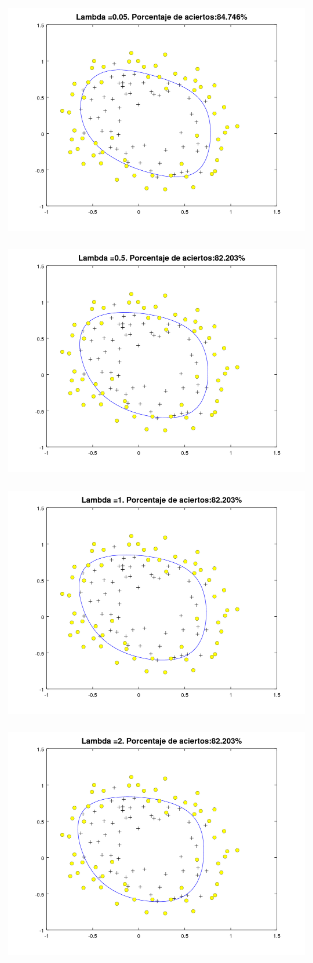 \documentclass{article}
\begin{document}
\begin{figure}[h]
\centering
\includegraphics[width=0.7\textwidth]{estudio4}
\label{fig:estudio}
\end{figure}

\begin{figure}[h]
\centering
\includegraphics[width=0.7\textwidth]{estudio5}
\label{fig:estudio}
\end{figure}

\begin{figure}[h]
\centering
\includegraphics[width=0.7\textwidth]{estudio6}
\label{fig:estudio}
\end{figure}

\begin{figure}[h]
\centering
\includegraphics[width=0.7\textwidth]{estudio7}
\label{fig:estudio}
\end{figure}
\end{document}
